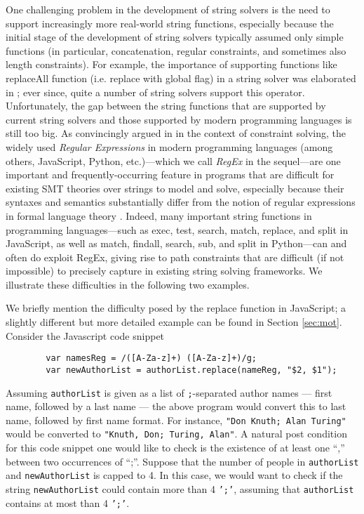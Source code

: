 One challenging problem in the development of string solvers is the need
to support increasingly more real-world string functions, especially because the
initial stage of the development of string solvers typically assumed only simple
functions (in particular, concatenation, regular constraints, and sometimes also
length constraints). For example, the importance of supporting functions like
replaceAll function (i.e. replace with global flag) in a string solver was 
elaborated in \cite{CCH+18};
ever since, quite a number of string solvers support this operator.
Unfortunately, the gap between the string functions that are supported by 
current string solvers and those supported by modern programming languages 
is still too big. As convincingly argued in \cite{LMK19} in the context of 
constraint solving, 
the widely used \emph{Regular Expressions} in modern programming
languages
(among others, JavaScript, Python, etc.)---which we call \emph{RegEx} 
in the sequel---are one important and frequently-occurring feature in
programs that are difficult for existing SMT theories over 
strings to model and solve, especially because their syntaxes and semantics 
substantially differ from the notion of regular expressions in formal 
language theory \cite{HU79}. Indeed,
many important string functions in programming languages---such as exec, test,
search, match, replace, and split in JavaScript, as well as match, findall,
search, sub, and split in Python---can and often do exploit RegEx, giving 
rise to path constraints that are difficult (if not impossible) to precisely 
capture in existing string solving frameworks. We illustrate these difficulties
in the following two examples.
\begin{example}\label{exmp-name-swap}
    We briefly mention the difficulty posed by the replace
    function in JavaScript; a slightly different but more detailed example can be found
    in Section \ref{sec:mot}. Consider the Javascript code snippet
    \begin{verbatim}
        var namesReg = /([A-Za-z]+) ([A-Za-z]+)/g;
        var newAuthorList = authorList.replace(nameReg, "$2, $1");
    \end{verbatim}
    Assuming \texttt{authorList} is given as a 
    list of \texttt{;}-separated author names --- first name, followed by a last name ---
    the above program would convert this to last name, followed by first name
    format. For instance, \texttt{"Don Knuth; Alan Turing"} would
    be converted to \texttt{"Knuth, Don; Turing, Alan"}.
    A natural post condition for this code snippet one would like to check is the existence of at least one ``,'' between two occurrences of ``;''.
\OMIT
{   
    Suppose that the number of people in \texttt{authorList} and 
   \texttt{newAuthorList} is capped to 4. In this case, we would want to
   check if the string \texttt{newAuthorList} could contain
   more than 4 \texttt{';'}, assuming that \texttt{authorList} contains at most
   than 4 \texttt{';'}.
}
\end{example}

